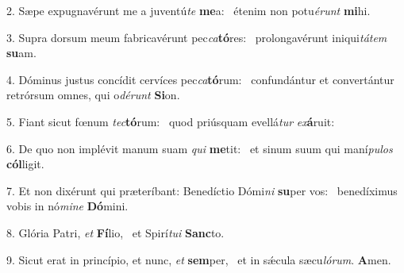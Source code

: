 2. Sæpe expugnavérunt me a juventú\textit{te} \textbf{me}a: \ast\  étenim non potu\textit{é}\textit{runt} \textbf{mi}hi.\

3. Supra dorsum meum fabricavérunt pec\textit{ca}\textbf{tó}res: \ast\  prolongavérunt iniqui\textit{tá}\textit{tem} \textbf{su}am.\

4. Dóminus justus concídit cervíces pec\textit{ca}\textbf{tó}rum: \ast\  confundántur et convertántur retrórsum omnes, qui o\textit{dé}\textit{runt} \textbf{Si}on.\

5. Fiant sicut fœnum \textit{tec}\textbf{tó}rum: \ast\  quod priúsquam evellá\textit{tur} \textit{ex}\textbf{á}ruit:\

6. De quo non implévit manum suam \textit{qui} \textbf{me}tit: \ast\  et sinum suum qui maní\textit{pu}\textit{los} \textbf{cól}ligit.\

7. Et non dixérunt qui præteríbant: Benedíctio Dómi\textit{ni} \textbf{su}per vos: \ast\  benedíximus vobis in nó\textit{mi}\textit{ne} \textbf{Dó}mini.\

8. Glória Patri, \textit{et} \textbf{Fí}lio, \ast\  et Spirí\textit{tu}\textit{i} \textbf{Sanc}to.\

9. Sicut erat in princípio, et nunc, \textit{et} \textbf{sem}per, \ast\  et in sǽcula sæcu\textit{ló}\textit{rum}. \textbf{A}men.\

